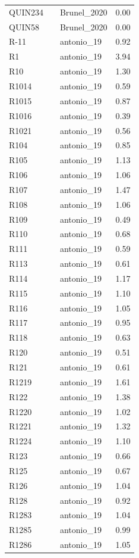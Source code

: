 \begin{longtable}[t]{lllr}
QUIN234 &  & Brunel\_2020 & 0.00\\
QUIN58 &  & Brunel\_2020 & 0.00\\
R-11 &  & antonio\_19 & 0.92\\
R1 &  & antonio\_19 & 3.94\\
R10 &  & antonio\_19 & 1.30\\
R1014 &  & antonio\_19 & 0.59\\
R1015 &  & antonio\_19 & 0.87\\
R1016 &  & antonio\_19 & 0.39\\
R1021 &  & antonio\_19 & 0.56\\
R104 &  & antonio\_19 & 0.85\\
R105 &  & antonio\_19 & 1.13\\
R106 &  & antonio\_19 & 1.06\\
R107 &  & antonio\_19 & 1.47\\
R108 &  & antonio\_19 & 1.06\\
R109 &  & antonio\_19 & 0.49\\
R110 &  & antonio\_19 & 0.68\\
R111 &  & antonio\_19 & 0.59\\
R113 &  & antonio\_19 & 0.61\\
R114 &  & antonio\_19 & 1.17\\
R115 &  & antonio\_19 & 1.10\\
R116 &  & antonio\_19 & 1.05\\
R117 &  & antonio\_19 & 0.95\\
R118 &  & antonio\_19 & 0.63\\
R120 &  & antonio\_19 & 0.51\\
R121 &  & antonio\_19 & 0.61\\
R1219 &  & antonio\_19 & 1.61\\
R122 &  & antonio\_19 & 1.38\\
R1220 &  & antonio\_19 & 1.02\\
R1221 &  & antonio\_19 & 1.32\\
R1224 &  & antonio\_19 & 1.10\\
R123 &  & antonio\_19 & 0.66\\
R125 &  & antonio\_19 & 0.67\\
R126 &  & antonio\_19 & 1.04\\
R128 &  & antonio\_19 & 0.92\\
R1283 &  & antonio\_19 & 1.04\\
R1285 &  & antonio\_19 & 0.99\\
R1286 &  & antonio\_19 & 1.05\\

\end{longtable}
